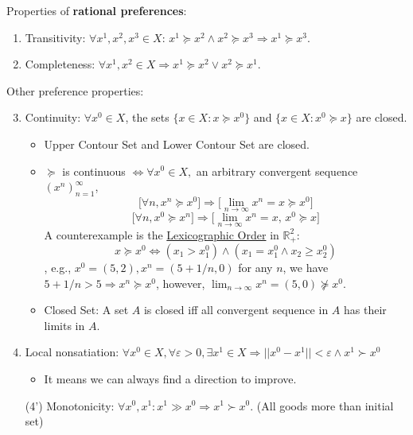 Properties of \textbf{rational preferences}: \begin{enumerate}
    \item Transitivity: $\forall x^{1}, x^{2}, x^{3} \in X$: $ x^{1} \succeq x^{2} \wedge  x^{2} \succeq x^{3} \Longrightarrow  x^{1} \succeq x^{3}$.
    \item Completeness: $\forall x^{1}, x^{2} \in X \Longrightarrow x^{1} \succeq x^{2} \vee x^{2} \succeq x^{1}$.
\end{enumerate}
Other preference properties:
\begin{enumerate}
    \setcounter{enumi}{2}
    \item Continuity: $\forall x^{0} \in X$, the sets $\{x \in X: x \succeq x^{0}\}$ and $\{x \in X: x^{0} \succeq x\}$ are closed. \begin{itemize}
              \item Upper Contour Set and Lower Contour Set are closed.
              \item $\succeq$ is continuous $\iff \forall x^{0} \in X, $ an arbitrary convergent sequence $(x^{n})^{\infty }_{n=1}$, \[
                        \Big[\forall n, x^{n} \succeq x^{0}\Big] \Longrightarrow \Big[\lim_{n \to \infty} x^{n} = x \succeq x^{0}\Big]
                    \] \[
                        \Big[\forall n, x^{0} \succeq x^{n}\Big] \Longrightarrow \Big[\lim_{n \to \infty} x^{n} = x,\, x^{0} \succeq x\Big]
                    \]
                    A counterexample is the \underline{Lexicographic Order} in $\mathbb{R}^{2}_{+}$: \[
                        x \succeq x^{0} \iff (x_1 > x_1^0) \wedge (x_1=x_1^0 \wedge x_2 \geq x_2^0)
                    \], e.g., $x^{0}=(5,2), x^{n} = (5+1/n,0)$ for any $n$, we have $5+1/n > 5 \Longrightarrow x^{n} \succeq x^{0}$, however, $\lim_{n \to \infty} x^{n} = (5,0) \nsucceq x^{0}$.
              \item Closed Set: A set $A$ is closed iff all convergent sequence in $A$ has their limits in $A$.
          \end{itemize}
    \item Local nonsatiation: $\forall x^{0} \in X, \forall \varepsilon > 0, \exists x^{1} \in X \Longrightarrow ||x^{0}-x^{1}||<\varepsilon \wedge x^{1} \succ x^{0}$ \begin{itemize}
              \item It means we can always find a direction to improve.
          \end{itemize}
    \item[(4')] Monotonicity: $\forall x^{0}, x^{1}: x^{1} \gg x^{0} \Longrightarrow x^{1} \succ x^{0}$. (All goods more than initial set)

\end{enumerate}
